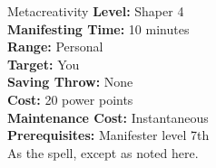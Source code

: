{Metacreativity}
{
    \textbf{Level:}
    Shaper 4\\
    \textbf{Manifesting Time:}
    10 minutes\\
    \textbf{Range:}
    Personal\\
    \textbf{Target:}
    You\\
    \textbf{Saving Throw:}
    None\\
    \textbf{Cost:}
    20 power points\\
    \textbf{Maintenance Cost:}
    Instantaneous\\
    \textbf{Prerequisites:}
    Manifester level 7th\\
}
{
    As the  spell, except as noted here.
}
